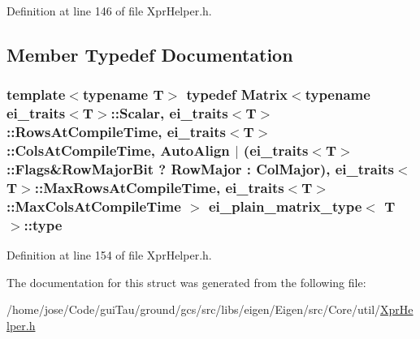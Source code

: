 Definition at line 146 of file Xpr\-Helper.\-h.



\subsection{Member Typedef Documentation}
\hypertarget{structei__plain__matrix__type_a3178ccba5bcd15a2c6e295d3cd2527a8}{
\subsubsection[{type}]{\setlength{\rightskip}{0pt plus 5cm}template$<$typename T$>$ typedef {\bf Matrix}$<$typename {\bf ei\-\_\-traits}$<$T$>$\-::Scalar, {\bf ei\-\_\-traits}$<$T$>$\-::Rows\-At\-Compile\-Time, {\bf ei\-\_\-traits}$<$T$>$\-::Cols\-At\-Compile\-Time, {\bf Auto\-Align} $|$ ({\bf ei\-\_\-traits}$<$T$>$\-::Flags\&{\bf Row\-Major\-Bit} ? {\bf Row\-Major} \-: {\bf Col\-Major}), {\bf ei\-\_\-traits}$<$T$>$\-::Max\-Rows\-At\-Compile\-Time, {\bf ei\-\_\-traits}$<$T$>$\-::Max\-Cols\-At\-Compile\-Time $>$ {\bf ei\-\_\-plain\-\_\-matrix\-\_\-type}$<$ T $>$\-::{\bf type}}}\label{structei__plain__matrix__type_a3178ccba5bcd15a2c6e295d3cd2527a8}


Definition at line 154 of file Xpr\-Helper.\-h.



The documentation for this struct was generated from the following file\-:\begin{DoxyCompactItemize}
\item 
/home/jose/\-Code/gui\-Tau/ground/gcs/src/libs/eigen/\-Eigen/src/\-Core/util/\hyperlink{_xpr_helper_8h}{Xpr\-Helper.\-h}\end{DoxyCompactItemize}
